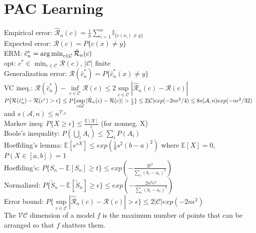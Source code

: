 \section{PAC Learning}
Empirical error: $\hat{\mathcal{R}}_n(c) = \tfrac{1}{n}\sum_{i=1}^n \mathbb{I}_{\{c(x_i)\neq y\}}$ \\
Expected error: $\mathcal{R}(c) = P\{c(x)\neq y\}$ \\
ERM: $\hat{c}_n^* = \operatorname*{arg\,min}_{c\in\mathcal{C}} \hat{\mathcal{R}}_n(c)$ \\
opt: $c^* \in \min_{c\in\mathcal{C}} \mathcal{R}(c)$, $|\mathcal{C}|$ finite \\
Generalization error: $\mathcal{R}(\hat{c}_n^*) = P\{ \hat{c}_n^*(x)\neq y \}$ \\
VC ineq.: $\mathcal{R}(\hat{c}_n^*) - \inf\limits_{c\in\mathcal{C}}\mathcal{R}(c) \leq 2\sup\limits_{c\in\mathcal{C}}|\hat{\mathcal{R}}_n(c) - \mathcal{R}(c)|$ \\ 
$P\{ \mathcal{R}(\hat{c}_n^*) - \mathcal{R}(c^*) > \epsilon \} \leq P\{ \sup\limits_{c\in\mathcal{C}}|\hat{\mathcal{R}}_n(c) - \mathcal{R}(c)| > \frac{\epsilon}{2} \} \\
\leq 2|\mathcal{C}| exp(-2n\epsilon ^2 /4) \leq 8s(\mathcal{A},n)exp(-n\epsilon ^{2} /32)$ and $s(\mathcal{A},n) \leq n^{\mathcal{V_{\mathcal{A}}}}$ \\
Markov ineq: $P\{X\geq\epsilon\} \leq \tfrac{\mathbb{E}[X]}{\epsilon}$ (for nonneg. X) \\
Boole's inequality: $P(\bigcup_i A_i) \leq \sum_i P(A_i)$ \\
Hoeffding's lemma: $\mathbb{E}[e^{sX}] \leq exp(\tfrac{1}{8}s^2(b-a)^2)$ where $\mathbb{E}[X]=0$, $P(X\in[a,b])=1$ \\
Hoeffding's: $P\{S_n {-} \mathbb{E}[S_n] {\geq} t\} {\leq} exp({-} \frac{2t^2}{\sum_i (b_i - a_i)^2})$ \\
Normalized: $P\{\widetilde{S}_n {-} \mathbb{E}[\widetilde{S}_n] {\geq} \epsilon\} {\leq} exp({-} \frac{2n^2 \epsilon ^2}{\sum_i (b_i {-} a_i)^2})$ \\
{\small Error bound: $P\{ \sup\limits_{c\in\mathcal{C}}|\hat{\mathcal{R}}_n(c) - \mathcal{R}(c)| > \epsilon \} \leq 2|\mathcal{C}| exp(-2n\epsilon ^2)$} \\
The $\mathcal{VC}$ dimension of a model $f$ is the maximum number of points that can be arranged so that $f$ shatters them.